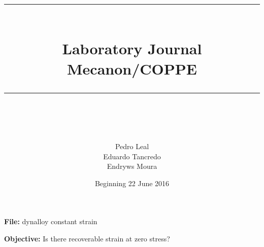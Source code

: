 \documentclass[idxtotoc,hyperref,openany]{labbook} %
\newcommand{\HRule}{\rule{\linewidth}{0.5mm}} %
\begin{document}

\frontmatter %
\title{
\begin{center}
\HRule \\[0.4cm]
{\Huge \bfseries Laboratory Journal \\[0.5cm] \Large Mecanon/COPPE}\\[0.4cm] %
\HRule \\[1.5cm]
\end{center}
}
\author{Pedro Leal \\  Eduardo Tancredo\\  Endryws Moura \\[2cm]} %
\date{Beginning 22 June 2016} %
\maketitle

\tableofcontents

\mainmatter %












\textbf{File:} dynalloy constant strain

\textbf{Objective:} Is there recoverable strain at zero stress?
\end{document}
